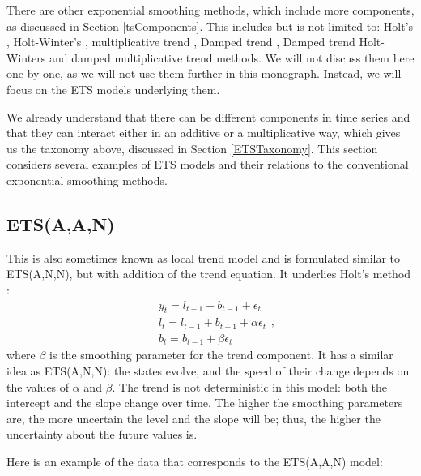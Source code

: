 \documentclass[
]{book}
\theoremstyle{definition}
\theoremstyle{definition}
\theoremstyle{definition}
\theoremstyle{definition}
\theoremstyle{remark}
\begin{document}
There are other exponential smoothing methods, which include more components, as discussed in Section \ref{tsComponents}. This includes but is not limited to: Holt's \citep[originally proposed in 1957]{Holt2004b}, Holt-Winter's \citep{Winters1960}, multiplicative trend \citep{Pegels1969}, Damped trend \citep[originally proposed by][ and then picked up by \citet{Gardner1985a}]{Roberts1982}, Damped trend Holt-Winters \citep{Gardner1989} and damped multiplicative trend \citep{Taylor2003} methods. We will not discuss them here one by one, as we will not use them further in this monograph. Instead, we will focus on the ETS models underlying them.

We already understand that there can be different components in time series and that they can interact either in an additive or a multiplicative way, which gives us the taxonomy above, discussed in Section \ref{ETSTaxonomy}. This section considers several examples of ETS models and their relations to the conventional exponential smoothing methods.

\hypertarget{ETSAAN}{%
\subsection{ETS(A,A,N)}\label{ETSAAN}}

This is also sometimes known as local trend model and is formulated similar to ETS(A,N,N), but with addition of the trend equation. It underlies Holt's method \citep{Ord1997}:
\begin{equation}
  \begin{aligned}
    & y_{t} = l_{t-1} + b_{t-1} + \epsilon_t \\
    & l_t = l_{t-1} + b_{t-1} + \alpha \epsilon_t \\
    & b_t = b_{t-1} + \beta \epsilon_t
  \end{aligned} ,
  \label{eq:ETSAAN}
\end{equation}
where \(\beta\) is the smoothing parameter for the trend component. It has a similar idea as ETS(A,N,N): the states evolve, and the speed of their change depends on the values of \(\alpha\) and \(\beta\). The trend is not deterministic in this model: both the intercept and the slope change over time. The higher the smoothing parameters are, the more uncertain the level and the slope will be; thus, the higher the uncertainty about the future values is.

Here is an example of the data that corresponds to the ETS(A,A,N) model:
\end{document}
